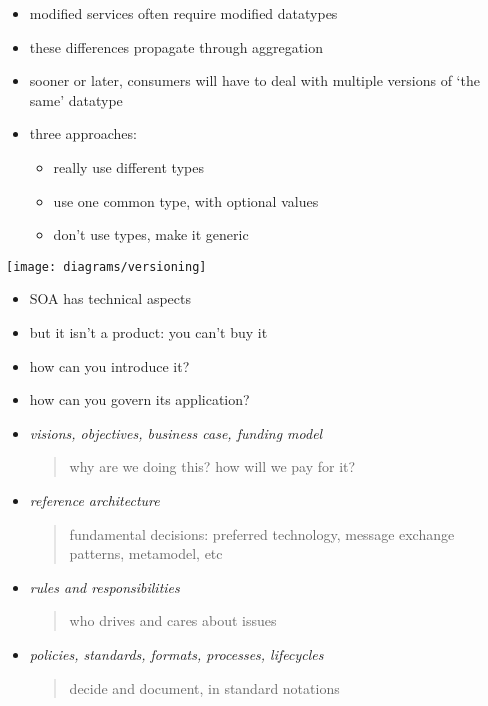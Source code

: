 \documentclass{sepslide-soa-faked} %
\begin{document}
\begin{slide}
\begin{itemize}
\item modified services often require modified datatypes
\item these differences propagate through aggregation
\item sooner or later, consumers will have to deal with multiple versions of `the same' datatype
\item three approaches:
\begin{itemize}
\item really use different types 
\item use one common type, with optional values
\item don't use types, make it generic
\end{itemize}
\end{itemize}
\end{slide}

\begin{slide}
\begin{flushleft}
\texttt{[image: diagrams/versioning]}
\end{flushleft}
\end{slide}

\begin{slide}
\begin{itemize}
\item SOA has technical aspects
\item but it isn't a product: you can't buy it
\item how can you introduce it?
\item how can you govern its application?
\end{itemize}
\end{slide}

\begin{slide}
\begin{itemize}
\item \emph{visions, objectives, business case, funding model}
\begin{quote}
why are we doing this? how will we pay for it?
\end{quote}
\item \emph{reference architecture}
\begin{quote}
fundamental decisions: preferred technology, message exchange patterns, metamodel, etc
\end{quote}
\item \emph{rules and responsibilities}
\begin{quote}
who drives and cares about issues
\end{quote}
\item \emph{policies, standards, formats, processes, lifecycles}
\begin{quote}
decide and document, in standard notations
\end{quote}
\end{itemize}
\end{slide}
\end{document}
